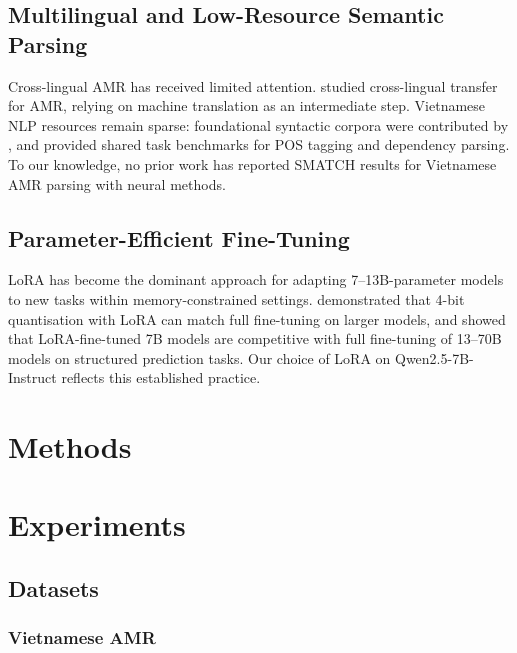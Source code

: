 \documentclass[11pt,a4paper]{article}
\begin{document}
\subsection{Multilingual and Low-Resource Semantic Parsing}

Cross-lingual AMR has received limited attention.
\citet{damonte2018cross} studied cross-lingual transfer for AMR, relying on
machine translation as an intermediate step. Vietnamese NLP resources remain
sparse: foundational syntactic corpora were contributed by
\citet{nguyen2009vietnamese}, and \citet{vu2018vislp} provided shared task
benchmarks for POS tagging and dependency parsing. To our knowledge, no prior
work has reported SMATCH results for Vietnamese AMR parsing with neural methods.

\subsection{Parameter-Efficient Fine-Tuning}

LoRA \citep{hu2021lora} has become the dominant approach for adapting
7--13B-parameter models to new tasks within memory-constrained settings.
\citet{zhang2023qlora} demonstrated that 4-bit quantisation with LoRA can
match full fine-tuning on larger models, and \citet{wang2023lora} showed that
LoRA-fine-tuned 7B models are competitive with full fine-tuning of 13--70B
models on structured prediction tasks. Our choice of LoRA on Qwen2.5-7B-Instruct
reflects this established practice.

\section{Methods}
\label{sec:methods}



\section{Experiments}
\label{sec:experiments}

\subsection{Datasets}

\subsubsection{Vietnamese AMR}
\end{document}
